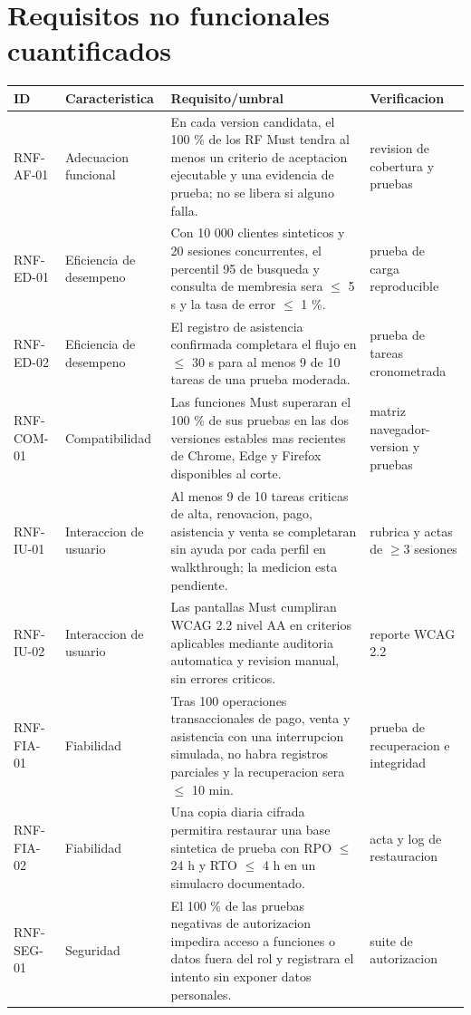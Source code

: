 \documentclass[11pt,a4paper,twoside]{article}
\begin{document}
\section{Requisitos no funcionales cuantificados}
\small
\begin{longtable}{p{1.8cm}p{2.2cm}p{6.5cm}p{3.7cm}}
\hline ID & Caracteristica & Requisito/umbral & Verificacion \\ \hline
RNF-AF-01 & Adecuacion funcional & En cada version candidata, el 100 \% de los RF Must tendra al menos un criterio de aceptacion ejecutable y una evidencia de prueba; no se libera si alguno falla. & revision de cobertura y pruebas \\ \hline
RNF-ED-01 & Eficiencia de desempeno & Con 10 000 clientes sinteticos y 20 sesiones concurrentes, el percentil 95 de busqueda y consulta de membresia sera $\leq$ 5 s y la tasa de error $\leq$ 1 \%. & prueba de carga reproducible \\ \hline
RNF-ED-02 & Eficiencia de desempeno & El registro de asistencia confirmada completara el flujo en $\leq$ 30 s para al menos 9 de 10 tareas de una prueba moderada. & prueba de tareas cronometrada \\ \hline
RNF-COM-01 & Compatibilidad & Las funciones Must superaran el 100 \% de sus pruebas en las dos versiones estables mas recientes de Chrome, Edge y Firefox disponibles al corte. & matriz navegador-version y pruebas \\ \hline
RNF-IU-01 & Interaccion de usuario & Al menos 9 de 10 tareas criticas de alta, renovacion, pago, asistencia y venta se completaran sin ayuda por cada perfil en walkthrough; la medicion esta pendiente. & rubrica y actas de $\geq$3 sesiones \\ \hline
RNF-IU-02 & Interaccion de usuario & Las pantallas Must cumpliran WCAG 2.2 nivel AA en criterios aplicables mediante auditoria automatica y revision manual, sin errores criticos. & reporte WCAG 2.2 \\ \hline
RNF-FIA-01 & Fiabilidad & Tras 100 operaciones transaccionales de pago, venta y asistencia con una interrupcion simulada, no habra registros parciales y la recuperacion sera $\leq$ 10 min. & prueba de recuperacion e integridad \\ \hline
RNF-FIA-02 & Fiabilidad & Una copia diaria cifrada permitira restaurar una base sintetica de prueba con RPO $\leq$ 24 h y RTO $\leq$ 4 h en un simulacro documentado. & acta y log de restauracion \\ \hline
RNF-SEG-01 & Seguridad & El 100 \% de las pruebas negativas de autorizacion impedira acceso a funciones o datos fuera del rol y registrara el intento sin exponer datos personales. & suite de autorizacion \\ \hline

\end{longtable}
\end{document}
